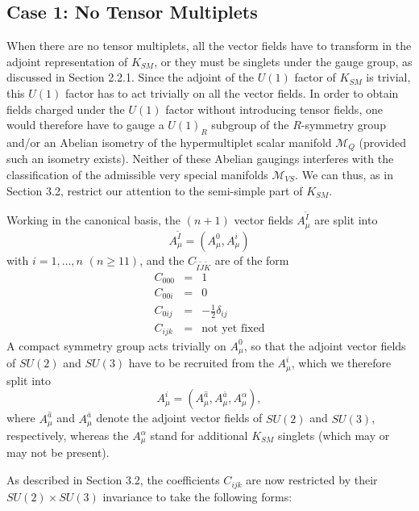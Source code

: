 \documentclass[a4paper,11pt]{article}
\newcommand{\nn}{\nonumber}
\newcommand{\ti}{\ensuremath{\tilde{I}}}
\newcommand{\tj}{\ensuremath{\tilde{J}}}
\newcommand{\tk}{\ensuremath{\tilde{K}}}
\newcommand{\M}{\ensuremath{\mathcal{M}}}
\begin{document}
\subsection{Case 1: No Tensor Multiplets}

When there are no tensor multiplets, all the vector fields have to
transform in the adjoint representation of $K_{SM}$, or they must be
singlets under the gauge group, as discussed in Section 2.2.1. Since the
adjoint of the $U(1)$ factor of $K_{SM}$ is trivial, this $U(1)$ factor
has to act trivially on all the vector fields. In order to obtain fields
charged under the $U(1)$ factor without introducing tensor fields, one
would therefore have to gauge a $U(1)_R$ subgroup of the $R$-symmetry
group and/or an Abelian isometry of the hypermultiplet scalar manifold
$\M_{Q}$ (provided such an isometry exists). Neither of these Abelian
gaugings interferes with the classification of the admissible very special
manifolds $\M_{VS}$. We can thus, as in Section 3.2, restrict our
attention to the semi-simple part of $K_{SM}$. 

Working in the canonical basis, the $(n+1)$ vector fields $A_{\mu}^{\ti}$
are split into 
\begin{displaymath}
A_{\mu}^{\ti}=(A_{\mu}^{0},A_{\mu}^{i})
\end{displaymath}
with $i=1,\ldots,n$ $(n\geq 11)$, and the  $C_{\ti\tj\tk}$ are of the form
\begin{eqnarray}
C_{000}&=&  1  \nn \\  C_{00i}&=& 0  \nn \\ 
 C_{0ij}&=& -\frac{1}{2} \delta_{ij}
\label{canonical3}\\
C_{ijk}&=&\textrm{not yet fixed} \nn
\end{eqnarray}
A compact symmetry group acts trivially on  $ A_{\mu}^{0}$,
so that the adjoint vector fields of $SU(2)$ and $SU(3)$ have to be recruited
from the $A_{\mu}^{i}$, which we therefore split into
\begin{displaymath}
A_{\mu}^{i}=(A_{\mu}^{\hat{a}},A_{\mu}^{\bar{a}},A_{\mu}^{\alpha}),
\end{displaymath}
where $A_{\mu}^{\hat{a}}$ and $A_{\mu}^{\bar{a}}$ denote
the adjoint vector fields of $SU(2)$ and $SU(3)$, respectively,
whereas the $A_{\mu}^{\alpha}$ stand for additional $K_{SM}$ singlets
(which may or may not be present).

As described in Section 3.2, the coefficients $C_{ijk}$ are now 
restricted by their $SU(2)\times SU(3)$ invariance to take the 
following forms:
\end{document}
